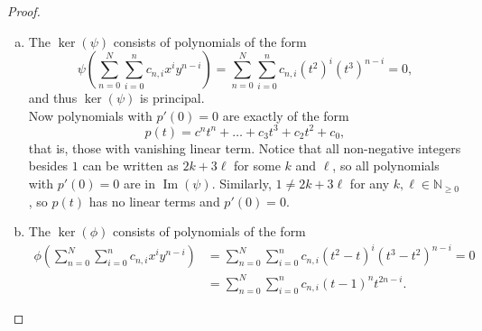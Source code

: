 \documentclass{article}
\newcommand{\paren}[1]{\left( #1 \right)}
\begin{document}
\begin{proof} ~
  \begin{enumerate}[(a)]
    \item The $\ker(\psi)$ consists of polynomials of the form \[
      \psi\paren{\sum_{n=0}^N \sum_{i=0}^n c_{n,i} x^i y^{n-i}}
      = \sum_{n=0}^N \sum_{i = 0}^n c_{n,i}(t^2)^i(t^3)^{n-i} = 0,
    \] and thus $\ker(\psi)$ is principal.
    \\
    Now polynomials with $p'(0) = 0$ are exactly of the form \[
      p(t) = c^nt^n + \hdots + c_3t^3 + c_2t^2 + c_0,
    \] that is, those with vanishing linear term. Notice that all non-negative
    integers besides $1$ can be written as $2k + 3\ell$ for some $k$ and $\ell$,
    so all polynomials with $p'(0) = 0$ are in $\operatorname{Im}(\psi)$.
    Similarly, $1 \neq 2k + 3\ell$ for any $k, \ell \in \mathbb N_{\geq 0}$,
    so $p(t)$ has no linear terms and $p'(0) = 0$.
    \item The $\ker(\phi)$ consists of polynomials of the form \begin{align*}
      \phi\paren{\sum_{n=0}^N \sum_{i=0}^n c_{n,i} x^i y^{n-i}}
      &= \sum_{n=0}^N \sum_{i = 0}^n c_{n,i}(t^2-t)^i(t^3-t^2)^{n-i} = 0 \\
      &= \sum_{n=0}^N \sum_{i = 0}^n c_{n,i}(t-1)^n t^{2n-i}.
    \end{align*}
  \end{enumerate}
\end{proof}
\end{document}
